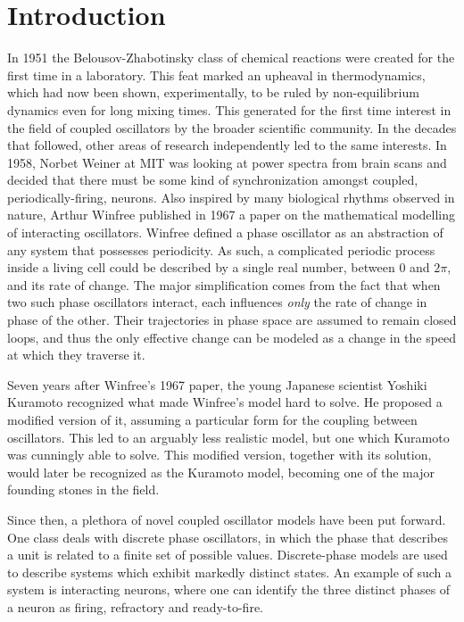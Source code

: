 \chapter*{Introduction}

In 1951 the Belousov-Zhabotinsky class of chemical reactions were created for the first time in a laboratory. This feat marked an
upheaval in thermodynamics, which had now been shown, experimentally, to be ruled by non-equilibrium dynamics even for long mixing
times. This generated for the first time interest in the field of coupled oscillators by the broader scientific community. In the
decades that followed, other areas of research independently led to the same interests. In 1958, Norbet Weiner at MIT was looking at
power spectra from brain scans and decided that there must be some kind of synchronization amongst coupled, periodically-firing,
neurons. Also inspired by many biological rhythms observed in nature, Arthur Winfree published in 1967 a paper on the mathematical
modelling of interacting oscillators. Winfree defined a phase oscillator as an abstraction of any system that possesses periodicity. As
such, a complicated periodic process inside a living cell could be described by a single real number, between $0$ and $2\pi$, and its
rate of change. The major simplification comes from the fact that when two such phase oscillators interact, each influences
\textit{only} the rate of change in phase of the other. Their trajectories in phase space are assumed to remain closed loops, and thus
the only effective change can be modeled as a change in the speed at which they traverse it.

Seven years after Winfree's 1967 paper, the young Japanese scientist Yoshiki Kuramoto recognized what made Winfree's model hard to
solve. He proposed a modified version of it, assuming a particular form for the coupling between oscillators. This led to an arguably
less realistic model, but one which Kuramoto was cunningly able to solve. This modified version, together with its solution, would
later be recognized as the Kuramoto model, becoming one of the major founding stones in the field.

Since then, a plethora of novel coupled oscillator models have been put forward. One class deals with discrete phase oscillators, in
which the phase that describes a unit is related to a finite set of possible values. Discrete-phase models are used to describe systems
which exhibit markedly distinct states. An example of such a system is interacting neurons, where one can identify the three distinct
phases of a neuron as firing, refractory and ready-to-fire.

